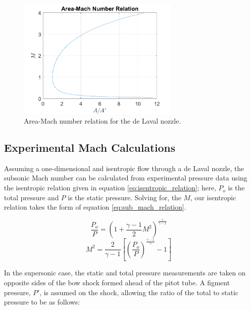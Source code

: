 \documentclass[runningheads]{llncs}
\begin{document}
\begin{figure}
    \centering
    \includegraphics[width=0.7\textwidth]{figures/area_mach_relation.png}
    \caption{Area-Mach number relation for the de Laval nozzle.}
    \label{fig:AM_relation}
\end{figure}

\subsection{Experimental Mach Calculations}

Assuming a one-dimensional and isentropic flow through a de Laval nozzle, the subsonic Mach number can be calculated from experimental pressure data using the isentropic relation given in equation \ref{eq:isentropic_relation}; here, $P_o$ is the total pressure and $P$ is the static pressure. Solving for, the $M$, our isentropic relation takes the form of equation \ref{eq:sub_mach_relation}.

\begin{multicols}{2}
\begin{equation}
    \frac{P_o}{P} = \left(1 + \frac{\gamma - 1}{2}M^2\right)^\frac{\gamma}{\gamma - 1}
    \label{eq:isentropic_relation}
\end{equation}
\begin{equation}
    M^2 = \frac{2}{\gamma - 1}\left[\left(\frac{P_o}{P}\right)^\frac{\gamma - 1}{\gamma} - 1\right]
    \label{eq:sub_mach_relation}
\end{equation}
\end{multicols}

\noindent
In the supersonic case, the static and total pressure measurements are taken on opposite sides of the bow shock formed ahead of the pitot tube. A figment pressure, $P'$, is assumed on the shock, allowing the ratio of the total to static pressure to be as follows:
\end{document}
